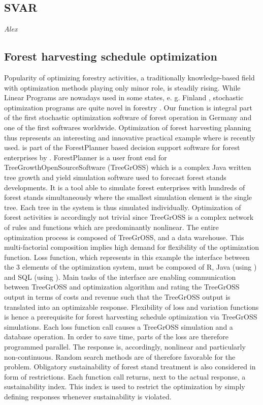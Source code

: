 \subsection{SVAR}
\textit{Alex}
\subsection{Forest harvesting schedule optimization}
Popularity of optimizing forestry activities, a traditionally knowledge-based field with optimization methods playing only minor role, is steadily rising. While Linear Programs are nowadays used in some states, e. g. Finland \citep{redsven_2012}, stochastic optimization programs are quite novel in forestry \citep{kangas_2015}. Our function is integral part of the first stochastic optimization software of forest operation in Germany and one of the first softwares worldwide. Optimization of forest harvesting planning thus represents an interesting and innovative practical example where  is recently used.  is part of the ForestPlanner based decision support software for forest enterprises by \citet{hansen_2014}. ForestPlanner is a user front end for TreeGrowthOpenSourceSoftware (TreeGrOSS) which is a complex Java written tree growth and yield simulation software used to forecast forest stands developments. It is a tool able to simulate forest enterprises with hundreds of forest stands simultaneously where the smallest simulation element is the single tree. Each tree in the system is thus simulated individually. Optimization of forest activities is accordingly not trivial since TreeGrOSS is a complex network of rules and functions which are predominantly nonlinear. The entire optimization process is composed of TreeGrOSS,  and a data warehouse. This multi-factorial composition implies high demand for flexibility of the optimization function. Loss function, which represents in this example the interface between the 3 elements of the optimization system, must be composed of R, Java (using ) and SQL (using ). Main tasks of the interface are enabling communication between TreeGrOSS and optimization algorithm and rating the TreeGrOSS output in terms of costs and revenue such that the TreeGrOSS output is translated into an optimizable response. Flexibility of loss and variation functions is hence a prerequisite for forest harvesting schedule optimization via TreeGrOSS simulations. Each loss function call causes a TreeGrOSS simulation and a database operation. In order to save time, parts of the loss are therefore programmed parallel. The response is, accordingly, nonlinear and particularly non-continuous. Random search methods are of therefore favorable for the problem. Obligatory sustainability of forest stand treatment is also considered in form of restrictions. Each function call returns, next to the actual response, a sustainability index. This index is used to restrict the optimization by simply defining  responses whenever sustainability is violated.

